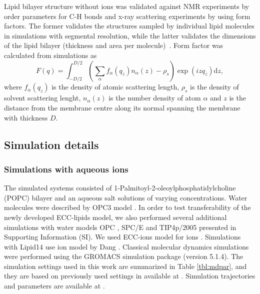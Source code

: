 \documentclass[aip,jcp,twocolumn]{revtex4}
\begin{document}
Lipid bilayer structure without ions was validated against NMR experiments
by order parameters for C-H bonds and x-ray scattering experiments by using
form factors. The former validates the structures sampled by individual
lipid molecules in simulations with segmental resolution, while the latter
validates the dimensions of the lipid bilayer (thickness and area per
molecule)~\cite{ollila16}. Form factor was calculated from simulations
as 
\begin{equation}
  F(q) = \int _{-D/2} ^{D/2} \left ( \sum _\alpha f_\alpha (q_z) n_\alpha (z) - \rho _s \right ) \exp (izq_z) \mathrm{d}z,
\end{equation}
where $f_\alpha(q_z)$ is the density of atomic scattering length, 
$\rho_s$ is the density of solvent scattering lenght,
$n_\alpha (z)$ is the number density of atom $\alpha$ and
$z$ is the distance from the membrane centre along its normal 
spanning the membrane with thickness $D$. 




\subsection{Simulation details}

\subsubsection{Simulations with aqueous ions}
The simulated systems consisted of 1-Palmitoyl-2-oleoylphosphatidylcholine
(POPC) bilayer and an aqueous salt solutions of varying concentrations.
Water molecules were described by OPC3 model \cite{Izadi16}.
In order to test transferability of the newly developed ECC-lipids model, 
we also performed several additional simulations with water models 
OPC \cite{Izadi14}, SPC/E \cite{Berendsen1987} and TIP4p/2005 \cite{Abascal2005}
presented in Supporting Information (SI). 
We used ECC-ions model for ions \cite{jungwirth17-new-paper-to-be-published, kohagen16, Pluharova2014}.  %
Simulations with Lipid14 use ion model by Dang \cite{smith94,chang1999,dang2006}. 
Classical molecular dynamics simulations were performed using the GROMACS \cite{Abraham15} simulation package (version 5.1.4).  
The simulation settings used in this work are 
summarized in Table \ref{tbl:mdpar}, 
and they are based on previously used settings in \cite{catte16} available at \cite{lipid14POPC0mMNaClfiles}. 
Simulation trajectories and parameters are available at \cite{??} .
\end{document}
